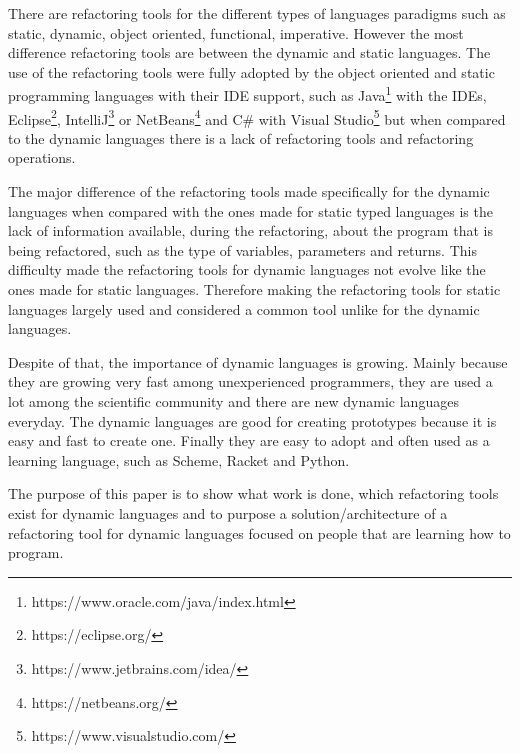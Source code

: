 There are refactoring tools for the different types of languages paradigms such as static, dynamic, object oriented, functional, imperative. However the most difference refactoring tools are between the dynamic and static languages. The use of the refactoring tools were fully adopted by the object oriented and static programming languages with their IDE support, such as Java\footnote{https://www.oracle.com/java/index.html} with the IDEs, Eclipse\footnote{https://eclipse.org/}, IntelliJ\footnote{https://www.jetbrains.com/idea/} or NetBeans\footnote{https://netbeans.org/} and C\# with Visual Studio\footnote{https://www.visualstudio.com/} but when %
compared to the dynamic languages there is a lack of refactoring tools and refactoring operations.

The major difference of the refactoring tools made specifically for the dynamic languages when compared with the ones made for static typed languages is the lack of information available, during the refactoring, about the program that is being refactored, such as the type of variables, parameters and returns. 
This difficulty made the refactoring tools for dynamic languages not evolve like the ones made for static languages. 
Therefore making the refactoring tools for static languages largely used and considered a common tool unlike for the dynamic languages.  %

Despite of that, the importance of dynamic languages is growing. Mainly because they are growing very fast among unexperienced programmers, they are used a lot among the scientific community and there are new dynamic languages everyday. 
The dynamic languages are good for creating prototypes because it is easy and fast to create one. Finally they are easy to adopt and often used as a learning language, such as Scheme, Racket and Python. %


The purpose of this paper is to show what work is done, which refactoring tools exist for dynamic languages and to purpose a solution/architecture of a refactoring tool for dynamic languages focused on people that are learning how to program. %







